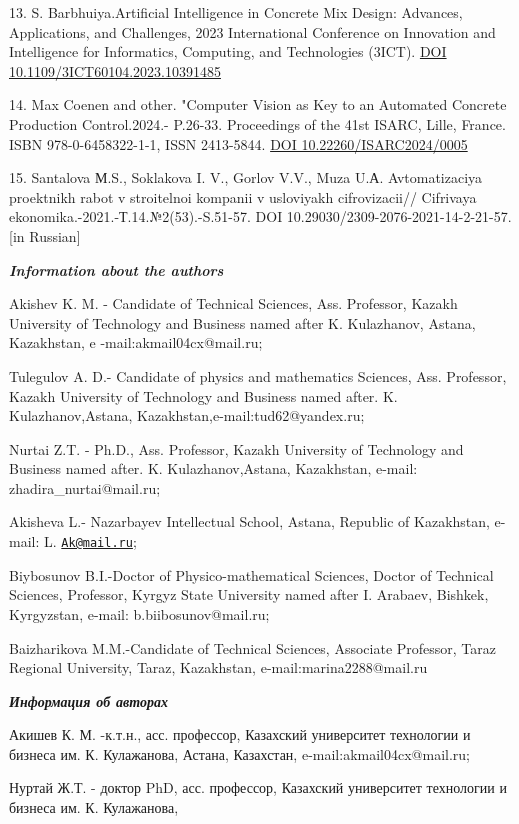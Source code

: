 \documentclass[
]{article}
\begin{document}
13. S. Barbhuiya.Artificial Intelligence in Concrete Mix Design:
Advances, Applications, and Challenges, 2023 International Conference on
Innovation and Intelligence for Informatics, Computing, and Technologies
(3ICT). \href{http://dx.doi.org/10.1109/3ICT60104.2023.10391485}{DOI
10.1109/3ICT60104.2023.10391485}

14. Max Coenen and other. "Computer Vision as Key to an Automated
Concrete Production Control.2024.- P.26-33. Proceedings of the 41st
ISARC, Lille, France. ISBN 978-0-6458322-1-1, ISSN 2413-5844.
\href{https://doi.org/10.22260/ISARC2024/0005}{DOI
10.22260/ISARC2024/0005}

15. Santalova М.S., Soklakova I. V., Gorlov V.V., Muza U.А.
Avtomatizaciya proektnikh rabot v stroitelnoi kompanii v usloviyakh
cifrovizacii// Cifrivaya ekonomika.-2021.-Т.14.№2(53).-S.51-57. DOI
10.29030/2309-2076-2021-14-2-21-57. {[}in Russian{]}

\emph{\textbf{Information about the authors}}

Akishev K. M. - Candidate of Technical Sciences, Ass. Professor, Kazakh
University of Technology and Business named after K. Kulazhanov, Astana,
Kazakhstan, e -mail:akmail04cx@mail.ru;

Tulegulov A. D.- Candidate of physics and mathematics Sciences, Ass.
Professor, Kazakh University of Technology and Business named after. K.
Kulazhanov,Astana, Kazakhstan,e-mail:tud62@yandex.ru;

Nurtai Z.T. - Ph.D., Ass. Professor, Kazakh University of Technology and
Business named after. K. Kulazhanov,Astana, Kazakhstan, e-mail:
zhadira\_nurtai@mail.ru;

Akisheva L.- Nazarbayev Intellectual School, Astana, Republic of
Kazakhstan, e-mail: L. \href{mailto:Ak@mail.ru}{\nolinkurl{Ak@mail.ru}};

Biybosunov B.I.-Doctor of Physico-mathematical Sciences, Doctor of
Technical Sciences, Professor, Kyrgyz State University named after I.
Arabaev, Bishkek, Kyrgyzstan, e-mail: b.biibosunov@mail.ru;

Baizharikova M.M.-Candidate of Technical Sciences, Associate Professor,
Taraz Regional University, Taraz, Kazakhstan, e-mail:marina2288@mail.ru

\emph{\textbf{Информация об авторах}}

Акишев К. М. -к.т.н., асс. профессор, Казахский университет технологии и
бизнеса им. К. Кулажанова, Астана, Казахстан, e-mail:akmail04cx@mail.ru;

Нуртай Ж.Т. - доктор PhD, асс. профессор, Казахский университет
технологии и бизнеса им. К. Кулажанова,
\end{document}
